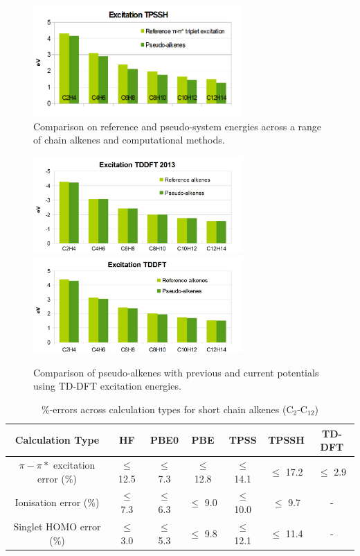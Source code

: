 \documentclass[journal=jctcce,manuscript=article]{achemso}
\begin{document}
\begin{figure}
\includegraphics[width=8cm]{tpssh_excitation}
\caption{Comparison on reference and pseudo-system energies across a range of chain alkenes and computational methods.}
\label{fig:alkenes_hf_dft}
\end{figure}
\begin{figure}
\includegraphics[width=8cm]{tddft_excitation_cd}
\includegraphics[width=8cm]{tddft_excitation}
\caption{Comparison of pseudo-alkenes with previous\cite{drujon_pseudopotentials_2013} and current potentials using TD-DFT excitation energies.}
\label{fig:alkenes_tddft}
\end{figure}

\begin{table}[ht]
\caption{\%-errors across calculation types for short chain alkenes  (C\(_{2}\)-C\(_{12}\))}
\begin{tabular}{c c c c c c c}
\hline\hline
Calculation Type & HF & PBE0 & PBE & TPSS & TPSSH & TD-DFT \\
\hline
\(\pi - \pi*\) excitation error (\%) & \(\leq\) 12.5 &\(\leq\) 7.3 & \(\leq\) 12.8 & \(\leq\) 14.1 & \(\leq\) 17.2 & \(\leq\) 2.9 \\
Ionisation error (\%) & \(\leq\) 7.3 & \(\leq\) 6.3 & \(\leq\) 9.0 & \(\leq\) 10.0 & \(\leq\) 9.7 & - \\
Singlet HOMO error (\%) & \(\leq\) 3.0 & \(\leq\) 5.3 & \(\leq\) 9.8 & \(\leq\) 12.1 & \(\leq\) 11.4 & - \\
\hline
\end{tabular}
\label{table:alkene_errors}
\end{table}
\end{document}
